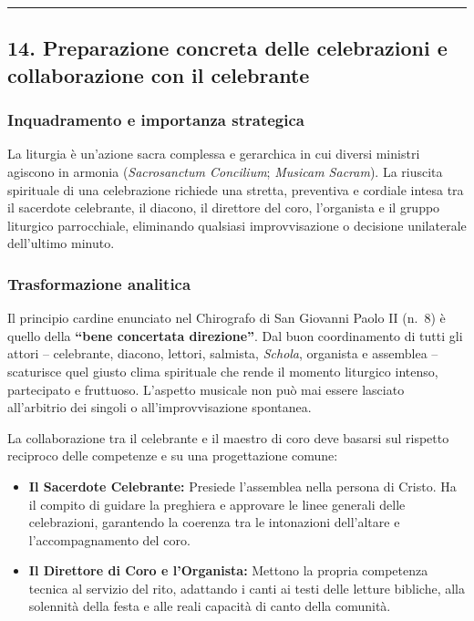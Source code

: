 \documentclass[12pt,a4paper]{article}
\begin{document}
	\begin{center}\rule{0.5\linewidth}{0.5pt}\end{center}
	
	\subsection{14. Preparazione concreta delle celebrazioni e collaborazione con il celebrante}\label{preparazione-concreta-delle-celebrazioni-e-collaborazione-con-il-celebrante}
	
	\subsubsection{Inquadramento e importanza strategica}\label{inquadramento-e-importanza-strategica-12}
	
	La liturgia è un'azione sacra complessa e gerarchica in cui diversi ministri agiscono in armonia (\emph{Sacrosanctum Concilium}; \emph{Musicam Sacram}). La riuscita spirituale di una celebrazione richiede una stretta, preventiva e cordiale intesa tra il sacerdote celebrante, il diacono, il direttore del coro, l'organista e il gruppo liturgico parrocchiale, eliminando qualsiasi improvvisazione o decisione unilaterale dell'ultimo minuto.
	
	\subsubsection{Trasformazione analitica}\label{trasformazione-analitica-13}
	
	Il principio cardine enunciato nel Chirografo di San Giovanni Paolo II (n.~8) è quello della \textbf{``bene concertata direzione''}. Dal buon coordinamento di tutti gli attori -- celebrante, diacono, lettori, salmista, \emph{Schola}, organista e assemblea -- scaturisce quel giusto clima spirituale che rende il momento liturgico intenso, partecipato e fruttuoso. L'aspetto musicale non può mai essere lasciato all'arbitrio dei singoli o all'improvvisazione spontanea.
	
	La collaborazione tra il celebrante e il maestro di coro deve basarsi sul rispetto reciproco delle competenze e su una progettazione comune:
	
	\begin{itemize}[leftmargin=*]
		\item \textbf{Il Sacerdote Celebrante:} Presiede l'assemblea nella persona di Cristo. Ha il compito di guidare la preghiera e approvare le linee generali delle celebrazioni, garantendo la coerenza tra le intonazioni dell'altare e l'accompagnamento del coro.
		\item \textbf{Il Direttore di Coro e l'Organista:} Mettono la propria competenza tecnica al servizio del rito, adattando i canti ai testi delle letture bibliche, alla solennità della festa e alle reali capacità di canto della comunità.
	\end{itemize}
	
\end{document}
